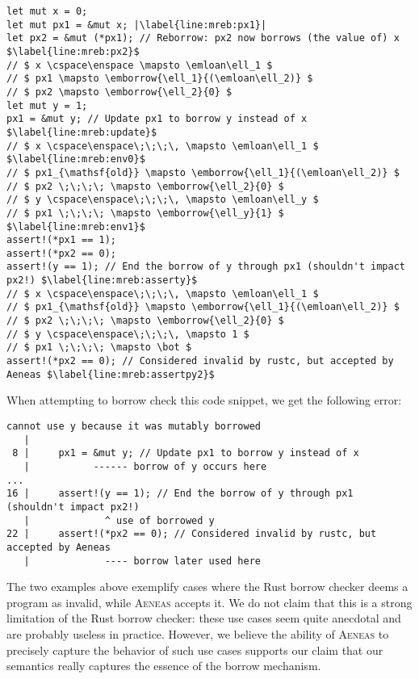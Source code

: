 \documentclass[acmsmall,screen]{acmart}
\newcommand{\aeneas}{\textsc{Aeneas}\xspace}
\newcommand\emborrow[2]{\ensuremath{\mathsf{borrow}^m\,#1\;#2}}
\newcommand\emloan[1]{\ensuremath{\mathsf{loan}^m\,#1}}
\newlength{\characterlength}
\newcommand\cspace{\hspace{\characterlength}}
\begin{document}
\begin{verbatim}
let mut x = 0;
let mut px1 = &mut x; |\label{line:mreb:px1}|
let px2 = &mut (*px1); // Reborrow: px2 now borrows (the value of) x $\label{line:mreb:px2}$
// $ x \cspace\enspace \mapsto \emloan\ell_1 $
// $ px1 \mapsto \emborrow{\ell_1}{(\emloan\ell_2)} $
// $ px2 \mapsto \emborrow{\ell_2}{0} $
let mut y = 1;
px1 = &mut y; // Update px1 to borrow y instead of x $\label{line:mreb:update}$
// $ x \cspace\enspace\;\;\;\, \mapsto \emloan\ell_1 $ $\label{line:mreb:env0}$
// $ px1_{\mathsf{old}} \mapsto \emborrow{\ell_1}{(\emloan\ell_2)} $
// $ px2 \;\;\;\; \mapsto \emborrow{\ell_2}{0} $
// $ y \cspace\enspace\;\;\;\, \mapsto \emloan\ell_y $
// $ px1 \;\;\;\; \mapsto \emborrow{\ell_y}{1} $ $\label{line:mreb:env1}$
assert!(*px1 == 1);
assert!(*px2 == 0);
assert!(y == 1); // End the borrow of y through px1 (shouldn't impact px2!) $\label{line:mreb:asserty}$
// $ x \cspace\enspace\;\;\;\, \mapsto \emloan\ell_1 $
// $ px1_{\mathsf{old}} \mapsto \emborrow{\ell_1}{(\emloan\ell_2)} $
// $ px2 \;\;\;\; \mapsto \emborrow{\ell_2}{0} $
// $ y \cspace\enspace\;\;\;\, \mapsto 1 $
// $ px1 \;\;\;\; \mapsto \bot $
assert!(*px2 == 0); // Considered invalid by rustc, but accepted by Aeneas $\label{line:mreb:assertpy2}$
\end{verbatim}

\noindent
When attempting to borrow check this code snippet, we get the following error:

\begin{verbatim}
cannot use y because it was mutably borrowed
   |
 8 |     px1 = &mut y; // Update px1 to borrow y instead of x
   |           ------ borrow of y occurs here
...
16 |     assert!(y == 1); // End the borrow of y through px1 (shouldn't impact px2!)
   |             ^ use of borrowed y
22 |     assert!(*px2 == 0); // Considered invalid by rustc, but accepted by Aeneas
   |             ---- borrow later used here
\end{verbatim}

The two examples above exemplify cases where the Rust borrow checker deems a program
as invalid, while \aeneas accepts it.
We do not claim that this is a strong limitation of the Rust borrow checker: these use cases
seem quite anecdotal and are probably useless in practice.
However, we believe the ability of \aeneas to precisely capture the behavior of such
use cases supports our claim that our semantics really captures the essence
of the borrow mechanism.
\end{document}
